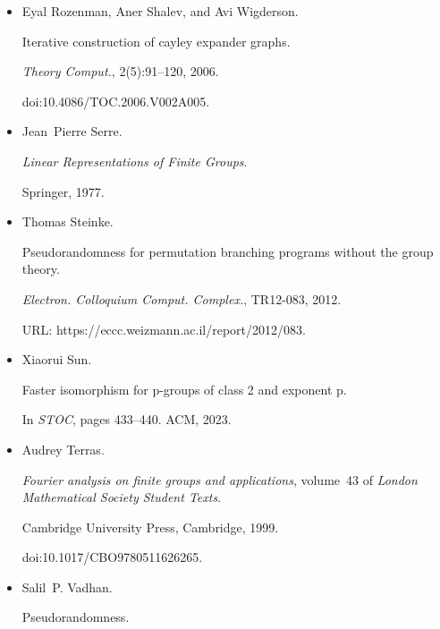 \documentclass[10pt,a4paper]{article}
\begin{document}
\begin{itemize}
\item[] 
[44]

Eyal Rozenman, Aner Shalev, and Avi Wigderson.


Iterative construction of cayley expander graphs.


\emph{Theory Comput.}, 2(5):91–120, 2006.


doi:10.4086/TOC.2006.V002A005.





\item[] 
[45]

Jean Pierre Serre.


\emph{Linear Representations of Finite Groups}.


Springer, 1977.





\item[] 
[46]

Thomas Steinke.


Pseudorandomness for permutation branching programs without the group
theory.


\emph{Electron. Colloquium Comput. Complex.}, TR12-083, 2012.


URL: https://eccc.weizmann.ac.il/report/2012/083.





\item[] 
[47]

Xiaorui Sun.


Faster isomorphism for p-groups of class 2 and exponent p.


In \emph{STOC}, pages 433–440. ACM, 2023.





\item[] 
[48]

Audrey Terras.


\emph{Fourier analysis on finite groups and applications}, volume 43
of \emph{London Mathematical Society Student Texts}.


Cambridge University Press, Cambridge, 1999.


doi:10.1017/CBO9780511626265.





\item[] 
[49]

Salil P. Vadhan.


Pseudorandomness.



\end{itemize}
\end{document}
